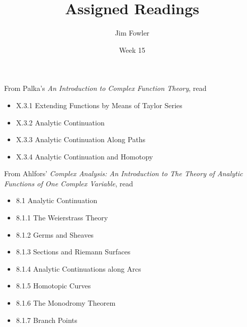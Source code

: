 \documentclass{homework}
\author{Jim Fowler}
\title{Assigned Readings}
\date{Week 15}
\begin{document}
\maketitle


From Palka's \textit{An Introduction to Complex Function Theory}, read
\begin{itemize}
\item X.3.1 Extending Functions by Means of Taylor Series 
\item X.3.2 Analytic Continuation
\item X.3.3 Analytic Continuation Along Paths
\item X.3.4 Analytic Continuation and Homotopy
\end{itemize}

From Ahlfors' \textit{Complex Analysis: An Introduction to The Theory of Analytic Functions of One Complex Variable}, read
\begin{itemize}
\item 8.1 Analytic Continuation
\item 8.1.1 The Weierstrass Theory
\item 8.1.2 Germs and Sheaves
\item 8.1.3 Sections and Riemann Surfaces
\item 8.1.4 Analytic Continuations along Arcs
\item 8.1.5 Homotopic Curves
\item 8.1.6 The Monodromy Theorem
\item 8.1.7 Branch Points
\end{itemize}
\end{document}
